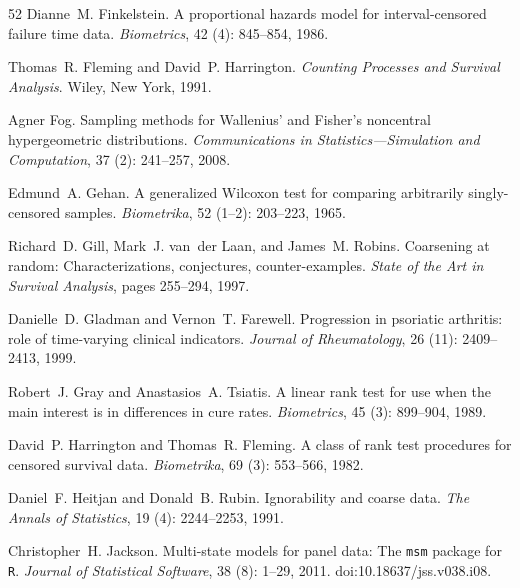 \documentclass[12pt]{article}
\theoremstyle{definition}
\theoremstyle{remark}
\begin{document}
\begin{thebibliography}{52}
Dianne~M. Finkelstein.
\newblock A proportional hazards model for interval-censored failure time data.
\newblock \emph{Biometrics}, 42 (4): 845--854, 1986.

Thomas~R. Fleming and David~P. Harrington.
\newblock \emph{Counting Processes and Survival Analysis}.
\newblock Wiley, New York, 1991.

Agner Fog.
\newblock Sampling methods for Wallenius' and Fisher's noncentral
  hypergeometric distributions.
\newblock \emph{Communications in Statistics---Simulation and Computation},
  37 (2): 241--257, 2008.

Edmund~A. Gehan.
\newblock A generalized {Wilcoxon} test for comparing arbitrarily
  singly-censored samples.
\newblock \emph{Biometrika}, 52 (1--2): 203--223, 1965.

Richard~D. Gill, Mark~J. van~der Laan, and James~M. Robins.
\newblock Coarsening at random: Characterizations, conjectures,
  counter-examples.
\newblock \emph{State of the Art in Survival Analysis}, pages 255--294, 1997.

Danielle~D. Gladman and Vernon~T. Farewell.
\newblock Progression in psoriatic arthritis: role of time-varying clinical
  indicators.
\newblock \emph{Journal of Rheumatology}, 26 (11):
  2409--2413, 1999.

Robert~J. Gray and Anastasios~A. Tsiatis.
\newblock A linear rank test for use when the main interest is in differences
  in cure rates.
\newblock \emph{Biometrics}, 45 (3): 899--904, 1989.

David~P. Harrington and Thomas~R. Fleming.
\newblock A class of rank test procedures for censored survival data.
\newblock \emph{Biometrika}, 69 (3): 553--566, 1982.

Daniel~F. Heitjan and Donald~B. Rubin.
\newblock Ignorability and coarse data.
\newblock \emph{The Annals of Statistics}, 19 (4):
  2244--2253, 1991.

Christopher~H. Jackson.
\newblock Multi-state models for panel data: The \texttt{msm} package for
  \texttt{R}.
\newblock \emph{Journal of Statistical Software}, 38 (8):
  1--29, 2011.
\newblock doi:10.18637/jss.v038.i08.


\end{thebibliography}
\end{document}
